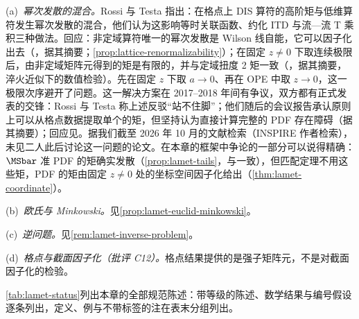 \begin{remark}[批评与回应]\label{rem:lattice-critiques}
(a)~\emph{幂次发散的混合。}Rossi 与 Testa 指出\cite{Rossi:2017muf,Rossi:2018zkn}：在格点上 DIS 算符的高阶矩与低维算符发生幂次发散的混合，他们认为这影响等时关联函数、约化 ITD 与流—流 T 乘积三种做法。回应：非定域算符唯一的幂次发散是 Wilson 线自能，它可以因子化出去（\cite{Ji:2017rah}，据其摘要；\cref{prop:lattice-renormalizability}）；在固定 $z\neq0$ 下取连续极限后，由非定域矩阵元得到的矩是有限的，并与定域扭度 2 矩一致（\cite{Karpie:2018zaz}，据其摘要，淬火近似下的数值检验）。先在固定 $z$ 下取 $a\to0$、再在 OPE 中取 $z\to0$，这一极限次序避开了问题。这一解决方案在 2017--2018 年间有争议，双方都有正式发表的交锋：Rossi 与 Testa 称上述反驳“站不住脚”\cite[第~3.1~节]{Rossi:2018zkn}；他们随后的会议报告承认原则上可以从格点数据提取单个的矩，但坚持认为直接计算完整的 PDF 存在障碍\cite{Rossi:2018stq}（据其摘要）；回应见\cite{Karpie:2018zaz,Radyushkin:2018nbf}。据我们截至 2026 年 10 月的文献检索（INSPIRE 作者检索），未见二人此后讨论这一问题的论文。在本章的框架中争论的一部分可以说得精确：$\MSbar$ 准 PDF 的矩确实发散（\cref{prop:lamet-tails}，与\cite{Radyushkin:2018nbf}一致），但匹配定理不用这些矩，PDF 的矩由固定 $z\neq0$ 处的坐标空间因子化给出（\cref{thm:lamet-coordinate}）。

(b)~\emph{欧氏与 Minkowski。}见\cref{prop:lamet-euclid-minkowski}。

(c)~\emph{逆问题。}见\cref{rem:lamet-inverse-problem}。

(d)~\emph{格点与截面因子化（批评 C12）。}格点结果提供的是强子矩阵元，不是对截面因子化的检验。
\end{remark}

\cref{tab:lamet-status}列出本章的全部规范陈述：带等级的陈述、数学结果与编号假设逐条列出，定义、例与不带标签的注在表末分组列出。

